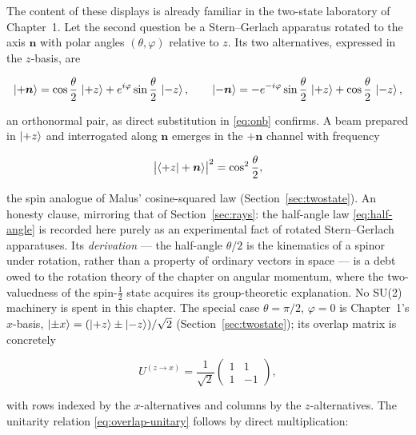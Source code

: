 The content of these displays is already familiar in the two-state laboratory of Chapter~1. Let the second question be a Stern--Gerlach apparatus rotated to the axis $\bm{n}$ with polar angles $(\theta,\varphi)$ relative to $z$. Its two alternatives, expressed in the $z$-basis, are
\begin{linenomath}
    \begin{equation}
        \ket{+\bm{n}}=\cos\frac{\theta}{2}\,\ket{+z}+e^{i\varphi}\sin\frac{\theta}{2}\,\ket{-z},
        \qquad
        \ket{-\bm{n}}=-e^{-i\varphi}\sin\frac{\theta}{2}\,\ket{+z}+\cos\frac{\theta}{2}\,\ket{-z},
        \label{eq:spin-n}
    \end{equation}
\end{linenomath}
an orthonormal pair, as direct substitution in \eqref{eq:onb} confirms. A beam prepared in $\ket{+z}$ and interrogated along $\bm{n}$ emerges in the $+\bm{n}$ channel with frequency
\begin{linenomath}
    \begin{equation}
        \bigl|\braket{+z|+\bm{n}}\bigr|^2=\cos^2\frac{\theta}{2},
        \label{eq:half-angle}
    \end{equation}
\end{linenomath}
the spin analogue of Malus' cosine-squared law (Section~\ref{sec:twostate}). An honesty clause, mirroring that of Section~\ref{sec:rays}: the half-angle law \eqref{eq:half-angle} is recorded here purely as an experimental fact of rotated Stern--Gerlach apparatuses. Its \emph{derivation} --- the half-angle $\theta/2$ is the kinematics of a spinor under rotation, rather than a property of ordinary vectors in space --- is a debt owed to the rotation theory of the chapter on angular momentum, where the two-valuedness of the spin-$\tfrac12$ state acquires its group-theoretic explanation. No SU(2) machinery is spent in this chapter. The special case $\theta=\pi/2$, $\varphi=0$ is Chapter~1's $x$-basis, $\ket{\pm x}=(\ket{+z}\pm\ket{-z})/\sqrt{2}$ (Section~\ref{sec:twostate}); its overlap matrix is concretely
\begin{linenomath}
    \begin{equation}
        U^{(z\to x)}=\frac{1}{\sqrt{2}}
        \begin{pmatrix}
            1 & 1\\
            1 & -1
        \end{pmatrix},
        \label{eq:x-overlap}
    \end{equation}
\end{linenomath}
with rows indexed by the $x$-alternatives and columns by the $z$-alternatives. The unitarity relation \eqref{eq:overlap-unitary} follows by direct multiplication:
